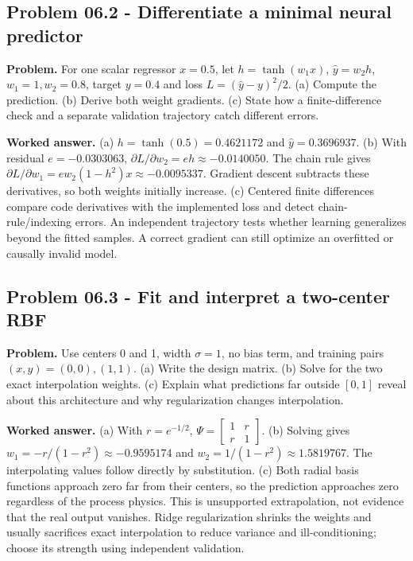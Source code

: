 \documentclass[11pt,a4paper]{article}
\begin{document}
\subsection{Problem 06.2 - Differentiate a minimal neural predictor}
\textbf{Problem.} For one scalar regressor $x=0.5$, let $h=\tanh(w_1x)$, $\hat y=w_2h$, $w_1=1,w_2=0.8$, target $y=0.4$ and loss $L=(\hat y-y)^2/2$. (a) Compute the prediction. (b) Derive both weight gradients. (c) State how a finite-difference check and a separate validation trajectory catch different errors.


\textbf{Worked answer.} (a) $h=\tanh(0.5)=0.4621172$ and $\hat y=0.3696937$. (b) With residual $e=-0.0303063$, $\partial L/\partial w_2=eh\approx-0.0140050$. The chain rule gives $\partial L/\partial w_1=ew_2(1-h^2)x\approx-0.0095337$. Gradient descent subtracts these derivatives, so both weights initially increase. (c) Centered finite differences compare code derivatives with the implemented loss and detect chain-rule/indexing errors. An independent trajectory tests whether learning generalizes beyond the fitted samples. A correct gradient can still optimize an overfitted or causally invalid model.

\subsection{Problem 06.3 - Fit and interpret a two-center RBF}
\textbf{Problem.} Use centers 0 and 1, width $\sigma=1$, no bias term, and training pairs $(x,y)=(0,0),(1,1)$. (a) Write the design matrix. (b) Solve for the two exact interpolation weights. (c) Explain what predictions far outside $[0,1]$ reveal about this architecture and why regularization changes interpolation.


\textbf{Worked answer.} (a) With $r=e^{-1/2}$, $\Psi=\begin{bmatrix}1&r\\r&1\end{bmatrix}$. (b) Solving gives $w_1=-r/(1-r^2)\approx-0.9595174$ and $w_2=1/(1-r^2)\approx1.5819767$. The interpolating values follow directly by substitution. (c) Both radial basis functions approach zero far from their centers, so the prediction approaches zero regardless of the process physics. This is unsupported extrapolation, not evidence that the real output vanishes. Ridge regularization shrinks the weights and usually sacrifices exact interpolation to reduce variance and ill-conditioning; choose its strength using independent validation.
\end{document}
